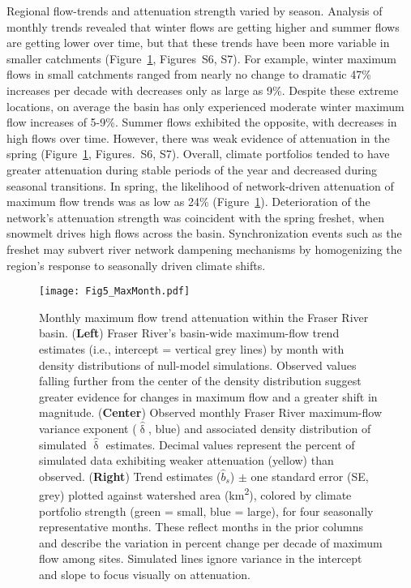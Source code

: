 \documentclass{AGUJournal}
\begin{document}
Regional flow-trends and attenuation strength varied by season. Analysis of monthly trends revealed that winter flows are getting higher and summer flows are getting lower over time, but that these trends have been more variable in smaller catchments (Figure~\ref{fig:4}, Figures~S6, S7). For example, winter maximum flows in small catchments ranged from nearly no change to dramatic 47\% increases per decade with decreases only as large as 9\%. Despite these extreme locations, on average the basin has only experienced moderate winter maximum flow increases of 5-9\%. Summer flows exhibited the opposite, with decreases in high flows over time. However, there was weak evidence of attenuation in the spring (Figure~\ref{fig:4}, Figures.~S6, S7). Overall, climate portfolios tended to have greater attenuation during stable periods of the year and decreased during seasonal transitions. In spring, the likelihood of network-driven attenuation of maximum flow trends was as low as 24\% (Figure~\ref{fig:4}). Deterioration of the network's attenuation strength was coincident with the spring freshet, when snowmelt drives high flows across the basin. Synchronization events such as the freshet may subvert river network dampening mechanisms by homogenizing the region's response to seasonally driven climate shifts.
 
\begin{figure}[h]
\centering
\texttt{[image: Fig5\_MaxMonth.pdf]}
	\caption{Monthly maximum flow trend attenuation within the Fraser River basin. (\textbf{Left}) Fraser River's basin-wide maximum-flow trend estimates (i.e., intercept = vertical grey lines) by month with density distributions of null-model simulations. Observed values falling further from the center of the density distribution suggest greater evidence for changes in maximum flow and a greater shift in magnitude. (\textbf{Center}) Observed monthly Fraser River maximum-flow variance exponent ($\hat{\updelta}$, blue) and associated density distribution of simulated $\hat{\updelta}$ estimates. Decimal values represent the percent of simulated data exhibiting weaker attenuation (yellow) than observed. (\textbf{Right}) Trend estimates ($\hat{b}_{s}$) $\pm$ one standard error (SE, grey) plotted against watershed area (km\textsuperscript{2}), colored by climate portfolio strength (green = small, blue = large), for four seasonally representative months. These reflect months in the prior columns and describe the variation in percent change per decade of maximum flow among sites. Simulated lines ignore variance in the intercept and slope to focus visually on attenuation.}
\label{fig:4}
\end{figure}
\end{document}
